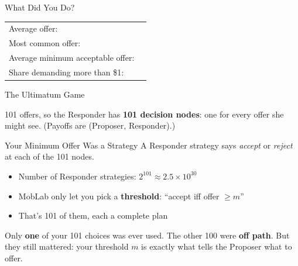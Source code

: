 \begin{frame}{What Did You Do?}
\vspace{0.5in}
\centering
\begin{tabular}{lc}
Average offer: & \underline{\hspace{1in}} \\[0.3in]
Most common offer: & \underline{\hspace{1in}} \\[0.3in]
Average minimum acceptable offer: & \underline{\hspace{1in}} \\[0.3in]
Share demanding more than \$1: & \underline{\hspace{1in}} \\[0.3in]
\end{tabular}
\end{frame}

\begin{frame}{The Ultimatum Game}
\centering
{}
\bsk
\raggedright
101 offers, so the Responder has \textbf{101 decision nodes}: one for every offer
she might see. (Payoffs are (Proposer, Responder).)
\vspace{-0.2in}
\end{frame}

\begin{frame}{Your Minimum Offer Was a Strategy}
A Responder strategy says \textit{accept} or \textit{reject} at each of the 101 nodes.
\bsk
\begin{itemize}
    \item Number of Responder strategies: $2^{101}\approx 2.5\times10^{30}$
    \item MobLab only let you pick a \textbf{threshold}: ``accept iff offer $\geq m$''
    \item That's 101 of them, each a complete plan
\end{itemize}
\bsk
Only \textbf{one} of your 101 choices was ever used. The other 100 were \textbf{off path}.
\bsk
But they still mattered: your threshold $m$ is exactly what tells the Proposer what to offer.
\vspace{-0.2in}
\end{frame}


